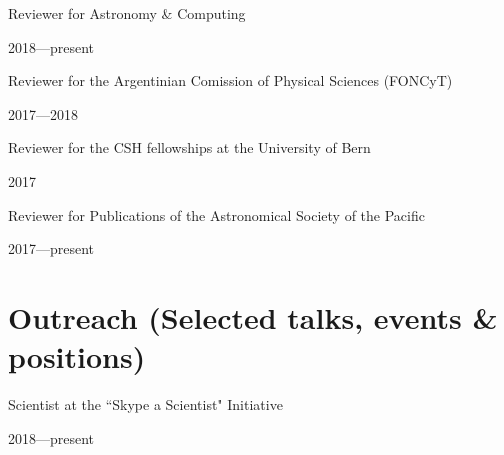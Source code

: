 \documentclass[12pt, a4paper]{article} %
\begin{document}
\begin{minipage}[t]{0.7\textwidth}
\begin{flushleft}%
  \setlength{\leftskip}{0.2cm}%
Reviewer for Astronomy \& Computing
\end{flushleft}
\end{minipage}
\begin{minipage}[t]{0.3\textwidth}
\hfill 2018---present
\end{minipage}

\begin{minipage}[t]{0.7\textwidth}
\begin{flushleft}%
  \setlength{\leftskip}{0.2cm}%
Reviewer for the Argentinian Comission of Physical Sciences (FONCyT)
\end{flushleft}
\end{minipage}
\begin{minipage}[t]{0.3\textwidth}
\hfill 2017---2018
\end{minipage}

\begin{minipage}[t]{0.7\textwidth}
\begin{flushleft}%
  \setlength{\leftskip}{0.2cm}%
Reviewer for the CSH fellowships at the University of Bern 
\end{flushleft}
\end{minipage}
\begin{minipage}[t]{0.3\textwidth}
\hfill 2017
\end{minipage}

\begin{minipage}[t]{0.7\textwidth}
\begin{flushleft}%
  \setlength{\leftskip}{0.2cm}%
Reviewer for Publications of the Astronomical Society of the Pacific 
\end{flushleft}
\end{minipage}
\begin{minipage}[t]{0.3\textwidth}
\hfill 2017---present
\end{minipage}

\section*{Outreach (Selected talks, events \& positions)}

\begin{minipage}[t]{0.7\textwidth}
\begin{flushleft}%
  \setlength{\leftskip}{0.2cm}%
Scientist at the ``Skype a Scientist" Initiative
\end{flushleft}
\end{minipage}
\begin{minipage}[t]{0.3\textwidth}
\hfill 2018---present
\end{minipage}
\end{document}
